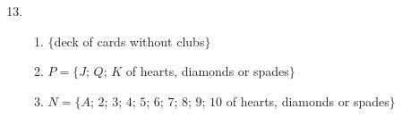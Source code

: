 {\begin{multicols}{3}
\begin{enumerate}[noitemsep, label=\textbf{\arabic*}. ]
\setcounter{enumi}{12}
      \item %
	    \begin{enumerate}[noitemsep, label=\textbf{(\alph*)} ]


    \item $\{$deck of cards without clubs$\}$
    \item $P = \{J$; $Q$; $K$ of hearts, diamonds or spades$\}$
    \item $N = \{A$; $2$; $ 3$; $ 4$; $ 5$; $ 6$; $ 7$; $ 8$; $ 9$; $ 10$ of hearts, diamonds or spades$\}$









\end{enumerate}
\end{enumerate}
\end{multicols}}
